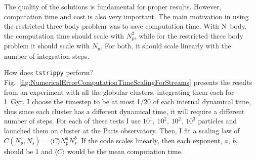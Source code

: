         The quality of the solutions is fundamental for proper results. However, computation time and cost is also very important. The main motivation in using the restricted three body problem was to save computation time. With N~body, the computation time should scale with $N_p^2$, while for the restricted three body problem it should scale with $N_p$. For both, it should scale linearly with the number of integration steps. 

        How does \texttt{tstrippy} perform? Fig.~\ref{fig:NumericalErrorComputationTimeScalingForStreams} presents the results from an experiment with all the globular clusters, integrating them each for 1~Gyr. I choose the timestep to be at most 1/20 of each internal dynamical time, thus since each cluster has a different dynamical time, it will require a different number of steps. For each of these tests I use $10^1,~10^2,~10^2,~10^3$ particles and launched them on cluster at the Paris observatory. Then, I fit a scaling law of $C(N_p,N_s) = \langle C\rangle N_p^a N_s^b$. If the code scales linearly, then each exponent, $a,~b$, should be 1 and $\langle C\rangle$ would be the mean computation time. 
        
